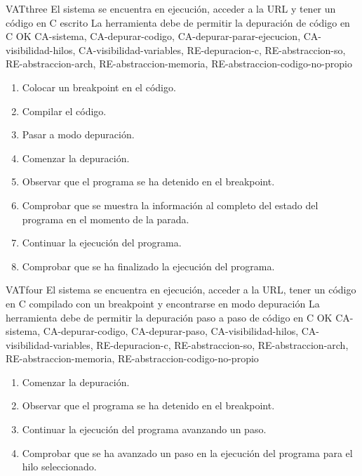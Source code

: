 \begin{testCase}{VAT}{three}
    {El sistema se encuentra en ejecución, acceder a la URL y tener un código en C escrito}
    {\NA}
    {La herramienta debe de permitir la depuración de código en C}
    {OK}
    {CA-sistema, CA-depurar-codigo, CA-depurar-parar-ejecucion, CA-visibilidad-hilos, CA-visibilidad-variables, RE-depuracion-c, RE-abstraccion-so, RE-abstraccion-arch, RE-abstraccion-memoria, RE-abstraccion-codigo-no-propio}
    \begin{enumerate}
        \item Colocar un breakpoint en el código.
        \item Compilar el código.
        \item Pasar a modo depuración.
        \item Comenzar la depuración.
        \item Observar que el programa se ha detenido en el breakpoint.
        \item Comprobar que se muestra la información al completo del estado del programa en el momento de la parada.
        \item Continuar la ejecución del programa.
        \item Comprobar que se ha finalizado la ejecución del programa.
    \end{enumerate}
\end{testCase}

\begin{testCase}{VAT}{four}
    {El sistema se encuentra en ejecución, acceder a la URL, tener un código en C compilado con un breakpoint y encontrarse en modo depuración}
    {\NA}
    {La herramienta debe de permitir la depuración paso a paso de código en C}
    {OK}
    {CA-sistema, CA-depurar-codigo, CA-depurar-paso, CA-visibilidad-hilos, CA-visibilidad-variables, RE-depuracion-c, RE-abstraccion-so, RE-abstraccion-arch, RE-abstraccion-memoria, RE-abstraccion-codigo-no-propio}
    \begin{enumerate}
        \item Comenzar la depuración.
        \item Observar que el programa se ha detenido en el breakpoint.
        \item Continuar la ejecución del programa avanzando un paso.
        \item Comprobar que se ha avanzado un paso en la ejecución del programa para el hilo seleccionado.
    \end{enumerate}
\end{testCase}
    
